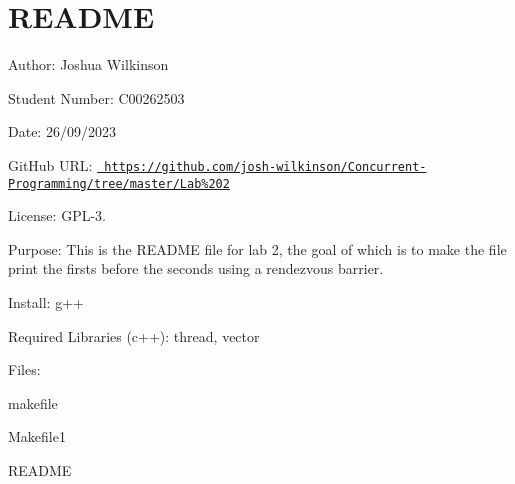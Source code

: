 \chapter{README}
\hypertarget{md__r_e_a_d_m_e}{}\label{md__r_e_a_d_m_e}
\label{md__r_e_a_d_m_e_autotoc_md0}%
%
 Author\+: Joshua Wilkinson

Student Number\+: C00262503

Date\+: 26/09/2023

Git\+Hub URL\+: \href{https://github.com/josh-wilkinson/Concurrent-Programming/tree/master/Lab\%202}{\texttt{ https\+://github.\+com/josh-\/wilkinson/\+Concurrent-\/\+Programming/tree/master/\+Lab\%202}}

License\+: GPL-\/3.

Purpose\+: This is the README file for lab 2, the goal of which is to make the file  print the firsts before the seconds using a rendezvous barrier.

Install\+: g++

Required Libraries (c++)\+: thread, vector

Files\+:
\begin{DoxyItemize}
\item makefile
\item Makefile1
\item README
\item {}
\item {}
\item {} 
\end{DoxyItemize}